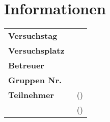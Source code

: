 \restoregeometry

\chapter*{Informationen}
\label{chap:info}

\begin{tabular}{l l}

	{\textbf{Versuchstag}} \hspace{1cm} & \hspace{1cm} {\datum}\\[0,2cm]
	{\textbf{Versuchsplatz}} \hspace{1cm} & \hspace{1cm} {\platz}\\[0,2cm]
	{\textbf{Betreuer}} \hspace{1cm} & \hspace{1cm} {\betreuer}\\[1,2cm]
	{\textbf{Gruppen Nr.}} \hspace{1cm} & \hspace{1cm} {\groupnr}\\[0.2cm]
	{\textbf{Teilnehmer}} \hspace{1cm} & \hspace{1cm} {\teilnehmerm~(\emailm)}\\[0.2cm]
						  \hspace{1cm} & \hspace{1cm} {\teilnehmerp~(\emailp)}\\[0.2cm]

\end{tabular}